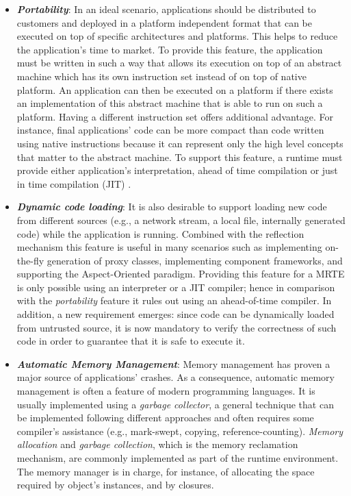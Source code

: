 \begin{itemize}
\item \textbf{\textit{Portability}}:
In an ideal scenario, applications should be distributed to customers and deployed in a platform independent format that can be executed on top of specific architectures and platforms.
This helps to reduce the application's time to market.
To provide this feature, the application must be written in such a way that allows its execution on top of an abstract machine which has its own instruction set instead of on top of native platform.
An application can then be executed on a platform if there exists an implementation of this abstract machine that is able to run on such a platform.
Having a different instruction set offers additional advantage.
For instance, final applications' code can be more compact than code written using native instructions because it can represent only the high level concepts that matter to the abstract machine.
To support this feature, a runtime must provide either application's interpretation, ahead of time compilation \cite{Muller:1997:HFE:1268028.1268029,Proebsting:1997:TJA:1268028.1268031,Wang:2011:MAC:2038698.2038704,Oh:2015:BAC:2757012.2757057} or just in time compilation (JIT) \cite{Inoue:2012:AMC:2398857.2384630,Paleczny:2001:JHT:1267847.1267848,Grcevski:2004:JTJ:1267242.1267254}.

\item \textbf{\textit{Dynamic code loading}}:
It is also desirable to support loading new code from different sources (e.g., a network stream, a local file, internally generated code) while the application is running.
Combined with the reflection mechanism this feature is useful in many scenarios such as implementing on-the-fly generation of proxy classes, implementing component frameworks, and supporting the Aspect-Oriented paradigm.
Providing this feature for a MRTE is only possible using an interpreter or a JIT compiler; hence in comparison with the \textit{portability} feature it rules out using an ahead-of-time compiler.
In addition, a new requirement emerges: since code can be dynamically loaded from untrusted source, it is now mandatory to verify the correctness of such code in order to guarantee that it is safe to execute it.  

\item \textbf{\textit{Automatic Memory Management}}: 
Memory management has proven a major source of applications' crashes.
As a consequence, automatic memory management is often a feature of modern programming languages.
It is usually implemented using a \textit{garbage collector}, a general technique that can be implemented following different approaches and often requires some compiler's assistance (e.g., mark-swept, copying, reference-counting).
\textit{Memory allocation} and \textit{garbage collection}, which is the memory reclamation mechanism, are commonly implemented as part of the runtime environment.
The memory manager is in charge, for instance, of allocating the space required by object's instances, and by closures.


\end{itemize}
